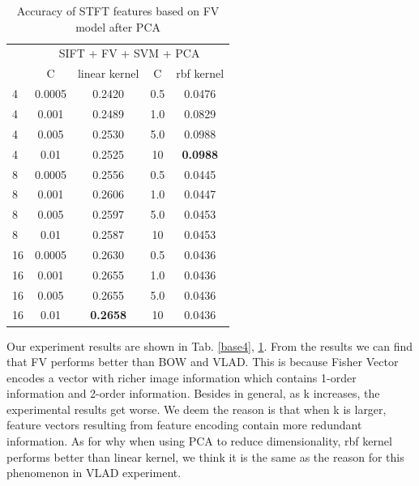 \documentclass[conference]{IEEEtran}
\begin{document}
\begin{table}[htbp]
	\centering
	\newcommand{\tabincell}[2]{\begin{tabular}{@{}#1@{}}#2\end{tabular}}
	\renewcommand\arraystretch{1.0}
	\caption{Accuracy of STFT features based on FV model after PCA}
	\label{base5}%
	\begin{tabular}{@{}p{1cm}<{\centering}|c|c|c|c}
		\hline
		\multirow{2}{*}{\diagbox[height=2\line,width=1.42cm,font=\tiny]{$k$}{Acc.}{$\mathit{M}$}} &
		\multicolumn{4}{c}{SIFT + FV + SVM + PCA}\\
		\cline{2-5}
		& {C} & {linear kernel} & {C} & {rbf kernel}\\
		\hline
		4   & 0.0005  & 0.2420 & 0.5 & 0.0476\\
		4   & 0.001  & 0.2489 & 1.0 & 0.0829\\
		4   & 0.005  & 0.2530 & 5.0 & 0.0988\\
        4   & 0.01  & 0.2525 & 10 & \textbf{0.0988}\\
        \hline
		8   & 0.0005 & 0.2556 & 0.5 & 0.0445\\
		8   & 0.001 & 0.2606 & 1.0 & 0.0447\\
		8   & 0.005 & 0.2597 & 5.0 & 0.0453\\
        8   & 0.01  & 0.2587 & 10 & 0.0453\\
        \hline
		16   & 0.0005  & 0.2630 & 0.5 & 0.0436\\
		16   & 0.001  & 0.2655 & 1.0 & 0.0436\\
		16   & 0.005  & 0.2655 & 5.0 & 0.0436\\
		16   & 0.01  & \textbf{0.2658} & 10 & 0.0436\\
		\hline
	\end{tabular}
\end{table}

Our experiment results are shown in Tab. \ref{base4}, \ref{base5}. From the results we can find that FV performs better than BOW and VLAD. This is because Fisher Vector encodes a vector with richer image information which contains 1-order information and 2-order information. Besides in general, as k increases, the experimental results get worse. We deem the reason is that when k is larger, feature vectors resulting from feature encoding contain more redundant information. As for why when using PCA to reduce dimensionality, rbf kernel performs better than linear kernel, we think it is the same as the reason for this phenomenon in VLAD experiment.
\end{document}

